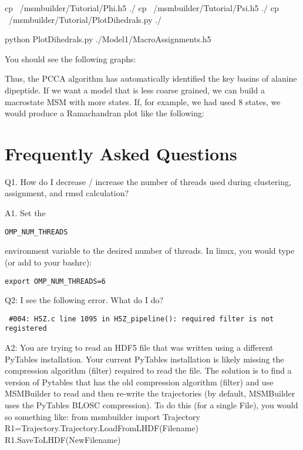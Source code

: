 \documentclass[12pt]{article}
\begin{document}
cp ~/msmbuilder/Tutorial/Phi.h5 ./
cp ~/msmbuilder/Tutorial/Psi.h5 ./
cp ~/msmbuilder/Tutorial/PlotDihedrals.py ./

python PlotDihedrals.py ./Model1/MacroAssignments.h5

You should see the following graphs:


Thus, the PCCA algorithm has automatically identified the key basins of alanine dipeptide.  If we want a model that is less coarse grained, we can build a macrostate MSM with more states.  If, for example, we had used 8 states, we would produce a Ramachandran plot like the following:

\newpage

\section{Frequently Asked Questions}

Q1.  How do I decrease / increase the number of threads used during clustering, assignment, and rmsd calculation?

A1.  Set the \begin{verbatim}OMP_NUM_THREADS\end{verbatim} environment variable to the desired number of threads.  In linux, you would type (or add to your bashrc):
\begin{verbatim}
export OMP_NUM_THREADS=6 
\end{verbatim}

\vspace{5mm}

Q2:  I see the following error.  What do I do?
\begin{verbatim}
 #004: H5Z.c line 1095 in H5Z_pipeline(): required filter is not registered
\end{verbatim}

A2:  You are trying to read an HDF5 file that was written using a different PyTables installation.  Your current PyTables installation is likely missing the compression algorithm (filter) required to read the file.  The solution is to find a version of Pytables that has the old compression algorithm (filter) and use MSMBuilder to read and then re-write the trajectories (by default, MSMBuilder uses the PyTables BLOSC compression).  To do this (for a single File), you would so something like:
from msmbuilder import Trajectory
R1=Trajectory.Trajectory.LoadFromLHDF(Filename)
R1.SaveToLHDF(NewFilename)

\vspace{5mm}
\end{document}
